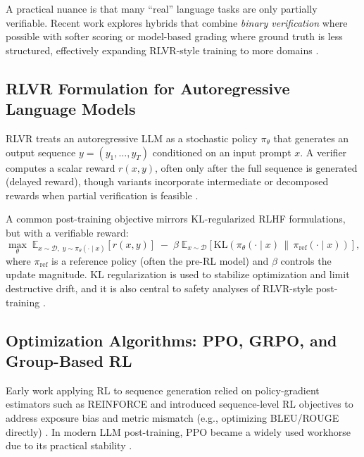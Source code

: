 \documentclass[10pt]{article}
\begin{document}
A practical nuance is that many ``real'' language tasks are only partially verifiable.
Recent work explores hybrids that combine \emph{binary verification} where possible with softer scoring or model-based grading where ground truth is less structured, effectively expanding RLVR-style training to more domains \cite{su2025crossingrewardbridge}.

\subsection{RLVR Formulation for Autoregressive Language Models}

RLVR treats an autoregressive LLM as a stochastic policy $\pi_\theta$ that generates an output sequence $y = (y_1,\dots,y_T)$ conditioned on an input prompt $x$.
A verifier computes a scalar reward $r(x,y)$, often only after the full sequence is generated (delayed reward), though variants incorporate intermediate or decomposed rewards when partial verification is feasible \cite{wang2026verpo}.

A common post-training objective mirrors KL-regularized RLHF formulations, but with a verifiable reward:
\begin{equation}
\label{eq:rlvr_objective}
\max_{\theta}\;
\mathbb{E}_{x \sim \mathcal{D},\; y \sim \pi_\theta(\cdot \mid x)}
\left[r(x,y)\right]
\;-\;
\beta\;\mathbb{E}_{x \sim \mathcal{D}}
\left[\mathrm{KL}\!\left(\pi_\theta(\cdot\mid x)\,\|\,\pi_{\mathrm{ref}}(\cdot\mid x)\right)\right],
\end{equation}
where $\pi_{\mathrm{ref}}$ is a reference policy (often the pre-RL model) and $\beta$ controls the update magnitude.
KL regularization is used to stabilize optimization and limit destructive drift, and it is also central to safety analyses of RLVR-style post-training \cite{cho2025safetycapability}.

\subsection{Optimization Algorithms: PPO, GRPO, and Group-Based RL}

Early work applying RL to sequence generation relied on policy-gradient estimators such as REINFORCE \cite{williams1992reinforce} and introduced sequence-level RL objectives to address exposure bias and metric mismatch (e.g., optimizing BLEU/ROUGE directly) \cite{ranzato2016sequence,paulus2018summarization}.
In modern LLM post-training, PPO became a widely used workhorse due to its practical stability \cite{schulman2017ppo,ouyang2022instructgpt}.
\end{document}
